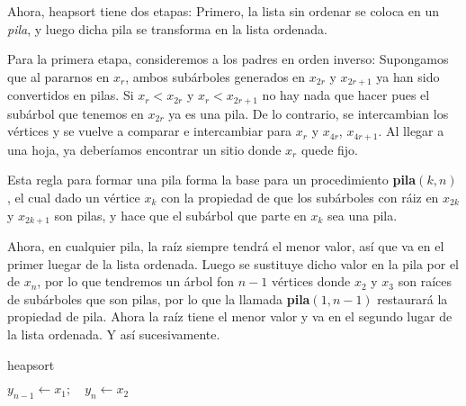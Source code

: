 Ahora, heapsort tiene dos etapas: Primero, la lista sin ordenar se coloca en un \textit{pila}, y luego dicha pila se transforma en la lista ordenada.

Para la primera etapa, consideremos a los padres en orden inverso: Supongamos que al pararnos en $x_r$, ambos subárboles generados en $x_{2r}$ y $x_{2r+1}$ ya han sido convertidos en pilas. Si $x_r < x_{2r}$ y $x_r < x_{2r+1}$ no hay nada que hacer pues el subárbol que tenemos en $x_{2r}$ ya es una pila. De lo contrario, se intercambian los vértices y se vuelve a comparar e intercambiar para $x_r$ y $x_{4r}$, $x_{4r+1}$. Al llegar a una hoja, ya deberíamos encontrar un sitio donde $x_r$ quede fijo.

Esta regla para formar una pila forma la base para un procedimiento \textbf{pila}$(k,n)$, el cual dado un vértice $x_k$ con la propiedad de que los subárboles con ráiz en $x_{2k}$ y $x_{2k+1}$ son pilas, y hace que el subárbol que parte en $x_k$ sea una pila.

Ahora, en cualquier pila, la raíz siempre tendrá el menor valor, así que va en el primer luegar de la lista ordenada. Luego se sustituye dicho valor en la pila por el de $x_n$, por lo que tendremos un árbol fon $n-1$ vértices donde $x_2$ y $x_3$ son raíces de subárboles que son pilas, por lo que la llamada \textbf{pila}$(1,n-1)$ restaurará la propiedad de pila. Ahora la raíz tiene el menor valor y va en el segundo lugar de la lista ordenada. Y así sucesivamente.

\begin{algoritmo}
    \caption{heapsort}\label{alg:pila}
    $y_{n-1} \leftarrow x_1; \quad y_n \leftarrow x_2$ 
\end{algoritmo}